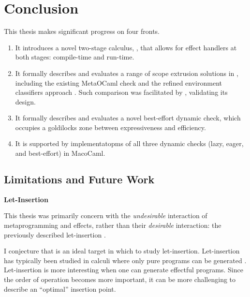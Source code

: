 \chapter{Conclusion}

This thesis makes significant progress on four fronts. 

\begin{enumerate}
\item It introduces a novel two-stage calculus, \calculusName{}, that allows for effect handlers at both stages: compile-time and run-time.

\item It formally describes and evaluates a range of scope extrusion solutions in \calculusName{}, including the existing MetaOCaml check \citep{kiselyov-14} and the refined environment classifiers approach \citep{kiselyov-16}. Such comparison was facilitated by \calculusName{}, validating its design.

\item It formally describes and evaluates a novel best-effort dynamic check, which occupies a goldilocks zone between expressiveness and efficiency.

\item It is supported by implementatopms of all three dynamic checks (lazy, eager, and best-effort) in MacoCaml. 
\end{enumerate}

\section{Limitations and Future Work}
\begin{minipage}[t]{0.25\textwidth}
  \textbf{\textsf{Let-Insertion}}
\end{minipage}%
\begin{minipage}[t]{0.75\textwidth}
  This thesis was primarily concern with the \textit{undesirable} interaction of metaprogramming and effects, rather than their \textit{desirable} interaction: the previously described let-insertion \citep{yallop-2019}. 
  \vspace{2mm}

  I conjecture that \calculusName{} is an ideal target in which to study let-insertion. Let-insertion has typically been studied in calculi where only pure programs can be generated \citep{isoda-24}. Let-insertion is more interesting when one can generate effectful programs. Since the order of operation becomes more important, it can be more challenging to describe an ``optimal'' insertion point.
  \vspace{4mm}
\end{minipage}\\

